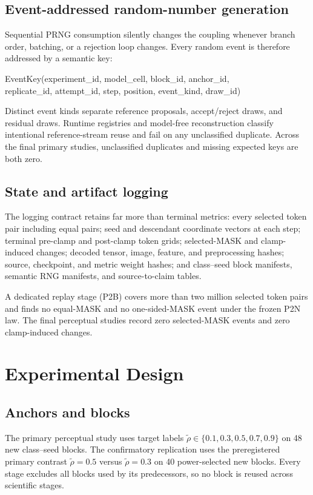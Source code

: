 \documentclass[11pt,a4paper]{article}
\theoremstyle{plain}
\theoremstyle{definition}
\theoremstyle{remark}
\newcommand{\rholabel}{\widetilde{\rho}}
\begin{document}
\subsection{Event-addressed random-number generation}
Sequential PRNG consumption silently changes the coupling whenever branch order,
batching, or a rejection loop changes. Every random event is therefore addressed
by a semantic key:
\begin{center}\ttfamily\small
EventKey(experiment\_id, model\_cell, block\_id, anchor\_id,\\
replicate\_id, attempt\_id, step, position, event\_kind, draw\_id)
\end{center}
Distinct event kinds separate reference proposals, accept/reject draws, and
residual draws. Runtime registries and model-free reconstruction classify
intentional reference-stream reuse and fail on any unclassified duplicate. Across
the final primary studies, unclassified duplicates and missing expected keys are
both zero.

\subsection{State and artifact logging}
The logging contract retains far more than terminal metrics: every selected token
pair including equal pairs; seed and descendant coordinate vectors at each step;
terminal pre-clamp and post-clamp token grids; selected-MASK and clamp-induced
changes; decoded tensor, image, feature, and preprocessing hashes; source,
checkpoint, and metric weight hashes; and class--seed block manifests, semantic
RNG manifests, and source-to-claim tables.

A dedicated replay stage (P2B) covers more than two million selected token pairs
and finds no equal-MASK and no one-sided-MASK event under the frozen P2N law. The
final perceptual studies record zero selected-MASK events and zero clamp-induced
changes.

\section{Experimental Design}
\label{sec:design}

\subsection{Anchors and blocks}
The primary perceptual study uses target labels $\rholabel \in \{0.1, 0.3, 0.5, 0.7, 0.9\}$ on 48
new class--seed blocks. The confirmatory replication uses the preregistered
primary contrast $\rholabel = 0.5$ versus $\rholabel = 0.3$ on 40 power-selected new
blocks. Every stage excludes all blocks used by its predecessors, so no block is
reused across scientific stages.
\end{document}
